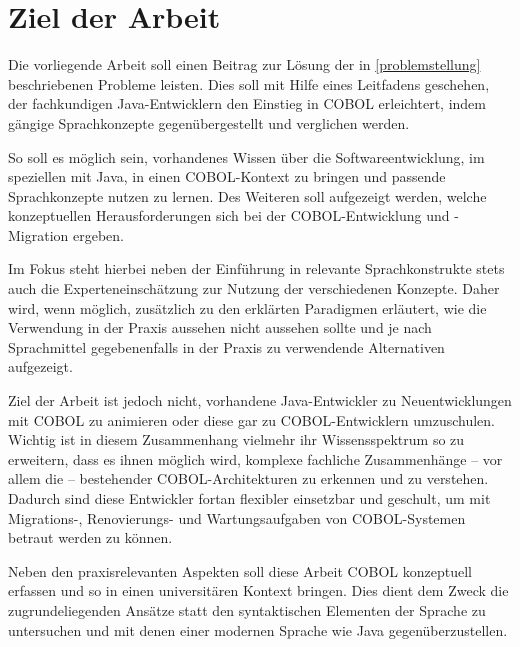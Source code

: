 \section{Ziel der Arbeit}
Die vorliegende Arbeit soll einen Beitrag zur Lösung der in \autoref{problemstellung} beschriebenen Probleme leisten. Dies soll mit Hilfe eines Leitfadens geschehen, der fachkundigen Java-Entwicklern den Einstieg in COBOL erleichtert, indem gängige Sprachkonzepte gegenübergestellt und verglichen werden. 

So soll es möglich sein, vorhandenes Wissen über die Softwareentwicklung, im speziellen mit Java, in einen COBOL-Kontext zu bringen und passende Sprachkonzepte nutzen zu lernen. Des Weiteren soll aufgezeigt werden, welche konzeptuellen Herausforderungen sich bei der COBOL-Entwicklung und -Migration ergeben.

Im Fokus steht hierbei neben der Einführung in relevante Sprachkonstrukte stets auch die Experteneinschätzung zur Nutzung der verschiedenen Konzepte. Daher wird, wenn möglich, zusätzlich zu den erklärten Paradigmen erläutert, wie die Verwendung in der Praxis aussehen \bzw nicht aussehen sollte und je nach Sprachmittel gegebenenfalls in der Praxis zu verwendende Alternativen aufgezeigt.

Ziel der Arbeit ist jedoch nicht, vorhandene Java-Entwickler zu Neuentwicklungen mit COBOL zu animieren oder diese gar zu COBOL-Entwicklern umzuschulen. Wichtig ist in diesem Zusammenhang vielmehr ihr Wissensspektrum so zu erweitern, dass es ihnen möglich wird, komplexe fachliche Zusammenhänge -- vor allem die  -- bestehender COBOL-Architekturen zu erkennen und zu verstehen. Dadurch sind diese Entwickler fortan flexibler einsetzbar und geschult, um mit Migrations-, Renovierungs- und Wartungsaufgaben von COBOL-Systemen betraut werden zu können.

Neben den praxisrelevanten Aspekten soll diese Arbeit COBOL konzeptuell erfassen und so in einen universitären Kontext bringen. Dies dient dem Zweck die zugrundeliegenden Ansätze statt den syntaktischen Elementen der Sprache zu untersuchen und mit denen einer modernen Sprache wie Java gegenüberzustellen.